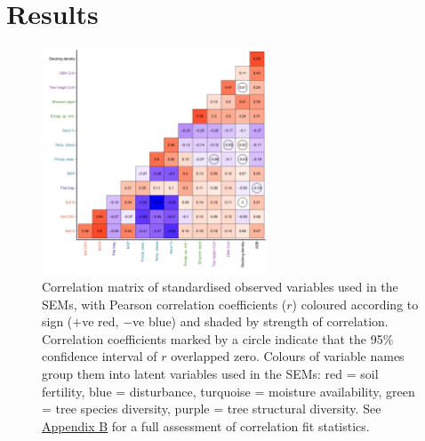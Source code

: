 \documentclass[11pt,a4paper]{article}
\begin{document}

\section{Results}

\begin{figure}[H]
\centering
	\includegraphics[width=0.6\textwidth]{corr_mat}
	\caption{Correlation matrix of standardised observed variables used in the SEMs, with Pearson correlation coefficients ($r$) coloured according to sign ($+$ve red, $-$ve blue) and shaded by strength of correlation. Correlation coefficients marked by a circle indicate that the 95\% confidence interval of $r$ overlapped zero. Colours of variable names group them into latent variables used in the SEMs: red = soil fertility, blue = disturbance, turquoise = moisture availability, green = tree species diversity, purple = tree structural diversity. See \hyperref[appendixb]{Appendix B} for a full assessment of correlation fit statistics.}
	\label{corr_mat}
\end{figure}
\end{document}
